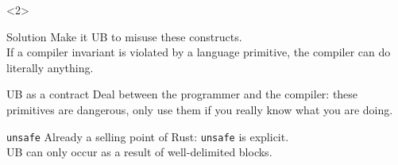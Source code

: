 \begin{frame}[fragile, t]
    \begin{onlyenv}<2>
        \begin{alertblock}{Solution}
            Make it UB to misuse these constructs.\\
            If a compiler invariant is violated by a language primitive, the compiler can do literally anything.
        \end{alertblock}
        \begin{block}{UB as a contract}
            Deal between the programmer and the compiler: these primitives are
            dangerous, only use them if you really know what you are doing.
        \end{block}
        \begin{exampleblock}{\texttt{unsafe}}
            Already a selling point of Rust: \texttt{unsafe} is explicit.\\
            UB can only occur as a result of well-delimited blocks.
        \end{exampleblock}
    \end{onlyenv}
\end{frame}

